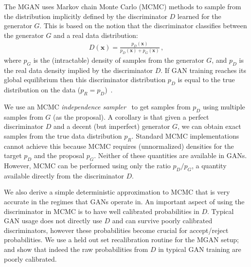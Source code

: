 \documentclass{article}
\renewcommand{\vec}[1]{{\boldsymbol{\mathbf{#1}}}} %
\newcommand{\PG}{{p_G}}
\newcommand{\PD}{{p_D}}
\newcommand{\PR}{{p_R}}
\begin{document}
The MGAN uses Markov chain Monte Carlo (MCMC) methods to sample from the distribution implicitly defined by the discriminator $D$ learned for the generator $G$.
This is based on the notion that the discriminator classifies between the generator $G$ and a real data distribution:
\begin{align}
  D(\vec x) = \frac{\PD(\vec x)}{\PD(\vec x) + \PG(\vec x)}\,,
\end{align}
where $\PG$ is the (intractable) density of samples from the generator $G$, and $\PD$ is the real data density implied by the discriminator $D$.
If GAN training reaches its global equilibrium then this discriminator distribution $\PD$ is equal to the true distribution on the data ($\PR = \PD$)~\citep{Goodfellow2014}.

We use an MCMC \emph{independence sampler}~\citep{Tierney1994} to get samples from $\PD$ using multiple samples from $G$ (as the proposal)\@.
A corollary is that given a perfect discriminator $D$ and a decent (but imperfect) generator $G$, we can obtain exact samples from the true data distribution $\PR$.
Standard MCMC implementations cannot achieve this because MCMC requires (unnormalized) densities for the target $\PD$ and the proposal $\PG$.
Neither of these quantities are available in GANs.
However, MCMC can be performed using only the ratio $\PD / \PG$, a quantity available directly from the discriminator $D$.



We also derive a simple deterministic approximation to MCMC that is very accurate in the regimes that GANs operate in.
An important aspect of using the discriminator in MCMC is to have well calibrated probabilities in $D$.
Typical GAN usage does not directly use $D$ and can survive poorly calibrated discriminators, however these probabilities become crucial for accept/reject probabilities.
We use a held out set recalibration routine for the MGAN setup; and show that indeed the raw probabilities from $D$ in typical GAN training are poorly calibrated.
\end{document}
